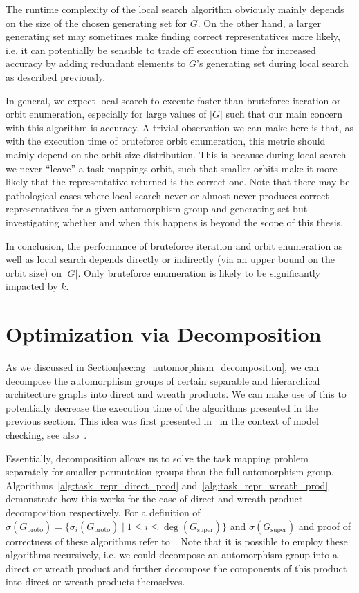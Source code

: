 The runtime complexity of the local search algorithm obviously mainly depends
on the size of the chosen generating set for $G$. On the other hand, a larger
generating set may sometimes make finding correct representatives more likely,
i.e. it can potentially be sensible to trade off execution time for increased
accuracy by adding redundant elements to $G$'s generating set during local
search as described previously.

In general, we expect local search to execute faster than bruteforce iteration
or orbit enumeration, especially for large values of $|G|$ such that our main
concern with this algorithm is accuracy. A trivial observation we can make here
is that, as with the execution time of bruteforce orbit enumeration, this
metric should mainly depend on the orbit size distribution. This is because
during local search we never ``leave'' a task mappings orbit, such that smaller
orbits make it more likely that the representative returned is the correct one.
Note that there may be pathological cases where local search never or almost
never produces correct representatives for a given automorphism group and
generating set but investigating whether and when this happens is beyond the
scope of this thesis.

In conclusion, the performance of bruteforce iteration and orbit enumeration as
well as local search depends directly or indirectly (via an upper bound on the
orbit size) on $|G|$. Only bruteforce enumeration is likely to be significantly
impacted by $k$.

\section{Optimization via Decomposition}
\label{sec:tmor_optimization_via_decomposition}

As we discussed in Section\ref{sec:ag_automorphism_decomposition}, we can
decompose the automorphism groups of certain separable and hierarchical
architecture graphs into direct and wreath products. We can make use of this to
potentially decrease the execution time of the algorithms presented in the
previous section. This idea was first presented in~\cite{Donaldson} in the
context of model checking, see also~\cite{DonaldsonThesis}.

Essentially, decomposition allows us to solve the task mapping problem
separately for smaller permutation groups than the full automorphism group.
Algorithms~\ref{alg:task_repr_direct_prod} and~\ref{alg:task_repr_wreath_prod}
demonstrate how this works for the case of direct and wreath product
decomposition respectively. For a definition of $\sigma(G_{\mathrm{proto}}) =
\{\sigma_i(G_{\mathrm{proto}}) \mid 1 \leq i \leq
\operatorname{deg}(G_{\mathrm{super}})\}$ and $\sigma(G_{\mathrm{super}})$ and
proof of correctness of these algorithms refer to~\cite{Donaldson}. Note that
it is possible to employ these algorithms recursively, i.e. we could decompose
an automorphism group into a direct or wreath product and further decompose the
components of this product into direct or wreath products themselves.

